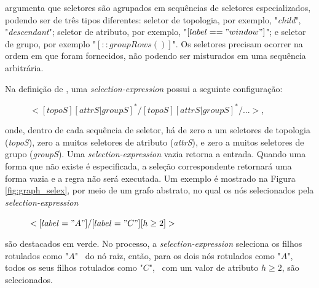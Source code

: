  argumenta que seletores são agrupados em sequências de seletores especializados, podendo ser de três tipos diferentes: seletor de topologia, por exemplo, "\textit{child}", "\textit{descendant}"; seletor de atributo, por exemplo, "$[label=="window"]$"; e seletor de grupo, por exemplo "$[::groupRows()]$". Os seletores precisam ocorrer na ordem em que foram fornecidos, não podendo ser misturados em uma sequência arbitrária. 

Na definição de , uma \textit{selection-expression} possui a seguinte configuração:

\vspace{0.5cm}

\begin{description}
    \item[] \qquad \qquad $<[topoS] [attrS | groupS]^* / [topoS] [attrS | groupS]^* / ... >$,
\end{description}

\vspace{0.5cm}

\noindent onde, dentro de cada sequência de seletor, há de zero a um seletores de topologia (\textit{topoS}), zero a muitos seletores de atributo (\textit{attrS}), e zero a muitos seletores de grupo (\textit{groupS}). Uma \textit{selection-expression} vazia retorna a entrada. Quando uma forma que não existe é especificada, a seleção correspondente retornará uma forma vazia e a regra não será executada. Um exemplo é mostrado na Figura \ref{fig:graph_selex}, por meio de um grafo abstrato, no qual os nós selecionados pela \textit{selection-expression} 

\vspace{0.5cm}

\begin{description}
    \item[] \qquad \qquad $<[label="A"] / [label="C"] [h \geq 2]>$
\end{description}

\vspace{0.5cm}

\noindent são destacados em verde. No processo, a \textit{selection-expression} seleciona os filhos rotulados como "$A$" \, do nó raiz, então, para os dois nós rotulados como "$A$", todos os seus filhos rotulados como "$C$", \, com um valor de atributo $h \geq 2$, são selecionados.

